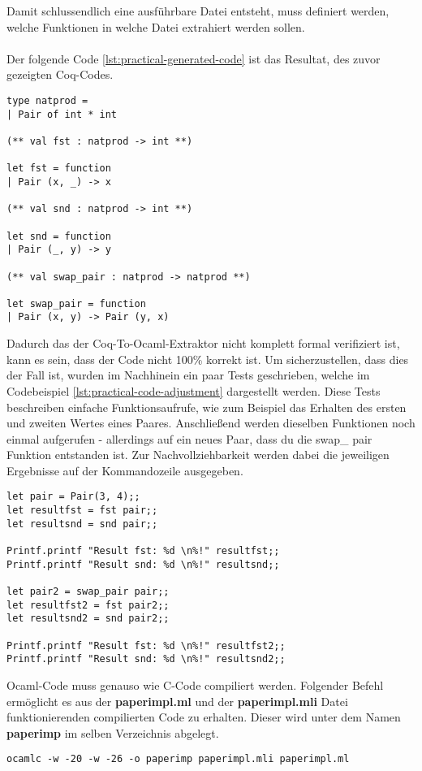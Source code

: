 Damit schlussendlich eine ausführbare Datei entsteht, muss definiert werden, welche Funktionen in welche Datei extrahiert werden sollen.\\
\\
Der folgende Code \ref{lst:practical-generated-code} ist das Resultat, des zuvor gezeigten Coq-Codes. 
\begin{lstlisting}[language=coq,firstnumber=1,caption=Ocaml Code anpassen,label=lst:practical-generated-code]
type natprod =
| Pair of int * int

(** val fst : natprod -> int **)

let fst = function
| Pair (x, _) -> x

(** val snd : natprod -> int **)

let snd = function
| Pair (_, y) -> y

(** val swap_pair : natprod -> natprod **)

let swap_pair = function
| Pair (x, y) -> Pair (y, x)
\end{lstlisting}
Dadurch das der Coq-To-Ocaml-Extraktor nicht komplett formal verifiziert ist, kann es sein, dass der Code nicht 100\% korrekt ist. Um sicherzustellen, dass dies der Fall ist, wurden im Nachhinein ein paar Tests geschrieben, welche im Codebeispiel \ref{lst:practical-code-adjustment} dargestellt werden. Diese Tests beschreiben einfache Funktionsaufrufe, wie zum Beispiel das Erhalten des ersten und zweiten Wertes eines Paares. Anschließend werden dieselben Funktionen noch einmal aufgerufen - allerdings auf ein neues Paar, dass du die swap\_	pair Funktion entstanden ist. Zur Nachvollziehbarkeit werden dabei die jeweiligen Ergebnisse auf der Kommandozeile ausgegeben.
\begin{lstlisting}[language=coq,firstnumber=1,caption=Ocaml Code anpassen,label=lst:practical-code-adjustment]
let pair = Pair(3, 4);;
let resultfst = fst pair;;
let resultsnd = snd pair;;

Printf.printf "Result fst: %d \n%!" resultfst;;
Printf.printf "Result snd: %d \n%!" resultsnd;;

let pair2 = swap_pair pair;;
let resultfst2 = fst pair2;;
let resultsnd2 = snd pair2;;

Printf.printf "Result fst: %d \n%!" resultfst2;;
Printf.printf "Result snd: %d \n%!" resultsnd2;;
\end{lstlisting}
Ocaml-Code muss genauso wie C-Code compiliert werden. Folgender Befehl ermöglicht es aus der \textbf{paperimpl.ml} und der \textbf{paperimpl.mli} Datei funktionierenden compilierten Code zu erhalten. Dieser wird unter dem Namen \textbf{paperimp} im selben Verzeichnis abgelegt.
\\
\begin{lstlisting}[language=coq,firstnumber=1,caption=Ocaml Code compilieren,label=lst:practical-code-compilation]
ocamlc -w -20 -w -26 -o paperimp paperimpl.mli paperimpl.ml
\end{lstlisting}

